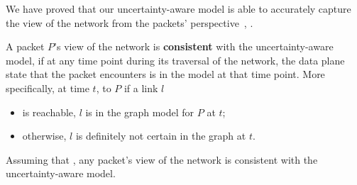 We have proved that our uncertainty-aware model is able to accurately 
capture the view of the network from the packets' perspective~\cite{gcc_tr},
.
  \vspace{-0.1in}
\begin{definition} A packet $P$'s view of the network is {\bf consistent} with
the uncertainty-aware model, if at any time point during its traversal of the
network, the data plane state that the packet encounters is in the model at
that time point. More specifically, at time $t$, to $P$ if a link $l$
\begin{itemize}[noitemsep,topsep=0pt,leftmargin=*] 
\item is reachable, $l$ is in the graph model for $P$ at $t$;
\item otherwise, $l$ is definitely not certain in the graph at $t$.
\end{itemize} \end{definition}
  \vspace{-0.1in}

  \vspace{-0.1in}
\begin{theorem} Assuming that ,
any packet's view of the network is consistent with the uncertainty-aware model.
\end{theorem}
  \vspace{-0.1in}


